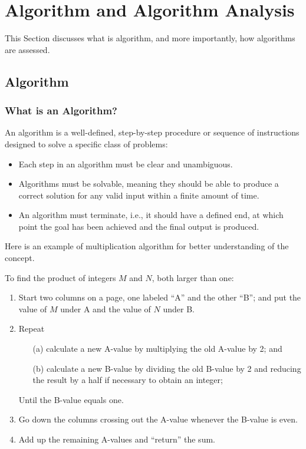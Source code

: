 \section{Algorithm and Algorithm Analysis}
	This Section discusses what is algorithm, and more importantly, how algorithms
	are assessed.

    \subsection{Algorithm}
    \subsubsection{What is an Algorithm?}
    \begin{definition}[Algorithm] \label{def:algo}
        An algorithm is a well-defined, step-by-step procedure or sequence of instructions designed to solve a specific class of problems:
        \begin{itemize}
            \item Each step in an algorithm must be clear and unambiguous. 
            \item Algorithms must be solvable, meaning they should be able to produce a correct solution for any valid input within a finite amount of time.
            \item An algorithm must terminate, i.e., it should have a defined end, at which point the goal has been achieved and the final output is produced.
        \end{itemize} 
    \end{definition}
    Here is an example of multiplication algorithm for better understanding of the concept.
    \begin{example}
        To find the product of integers \( M \) and \( N \), both larger than one:

        \begin{enumerate}
            \item Start two columns on a page, one labeled ``A'' and the other ``B''; and put the value of \( M \) under A and the value of \( N \) under B.
            
            \item Repeat
            \begin{itemize}
                \item[(a)] calculate a new A-value by multiplying the old A-value by 2; and
                \item[(b)] calculate a new B-value by dividing the old B-value by 2 and reducing the result by a half if necessary to obtain an integer;
            \end{itemize}
            Until the B-value equals one.
            
            \item Go down the columns crossing out the A-value whenever the B-value is even.
            
            \item Add up the remaining A-values and ``return'' the sum.
        \end{enumerate}
    \end{example}

